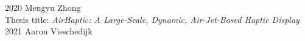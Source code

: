
      \begin{cvreviews}
        \cvreview
          {2020}
          {Mengyu Zhong\\
          Thesis title: \emph{AirHaptic: A Large-Scale, Dynamic, Air-Jet-Based Haptic Display}}
        \cvreview
          {2021}
          {Aaron Visschedijk}
      \end{cvreviews}